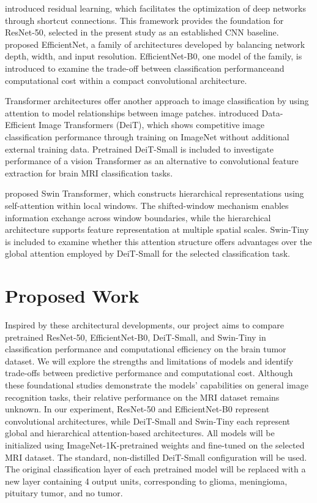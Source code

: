 \documentclass{article}
\begin{document}
\citet{he2016} introduced residual learning,
which facilitates the optimization of deep networks through shortcut connections. This framework provides the foundation for ResNet-50,
selected in the present study as an established CNN baseline. \citet{tan2019} proposed EfficientNet, a family of architectures developed by
balancing network depth, width, and input resolution. EfficientNet-B0, one model of the family, is introduced to examine the trade-off between 
classification performanceand computational cost within a compact convolutional architecture.

Transformer architectures offer another approach to image classification by using attention to model relationships between image patches.
\citet{touvron2021} introduced Data-Efficient Image Transformers (DeiT), which shows competitive image classification performance through
training on ImageNet without additional external training data. Pretrained DeiT-Small is included to investigate performance of a vision
Transformer as an alternative to convolutional feature extraction for brain MRI classification tasks.

\citet{liu2021} proposed Swin Transformer, which constructs hierarchical representations using self-attention within local windows.
The shifted-window mechanism enables information exchange across window boundaries, while the hierarchical architecture supports feature
representation at multiple spatial scales. Swin-Tiny is included to examine whether this attention structure offers advantages over the global
attention employed by DeiT-Small for the selected classification task.

\section*{Proposed Work}
\setlength{\emergencystretch}{2em}
Inspired by these architectural developments, our project aims to compare pretrained ResNet-50, \mbox{EfficientNet-B0}, DeiT-Small, and Swin-Tiny
in classification performance and computational efficiency on the brain tumor dataset. We will explore the strengths and limitations of
models and identify trade-offs between predictive performance and computational cost. Although these foundational studies demonstrate
the models' capabilities on general image recognition tasks, their relative performance on the MRI dataset remains unknown. In our
experiment, ResNet-50 and EfficientNet-B0 represent convolutional architectures, while DeiT-Small and Swin-Tiny each represent global and
hierarchical attention-based architectures. All models will be initialized using ImageNet-1K-pretrained weights and fine-tuned on the
selected MRI dataset. The standard, non-distilled DeiT-Small configuration will be used. The original classification layer of each pretrained
model will be replaced with a new layer containing 4 output units, corresponding to glioma, meningioma, pituitary tumor, and no tumor.
\end{document}
